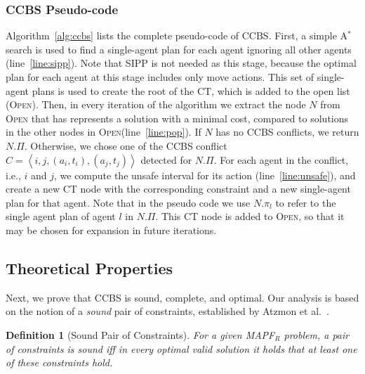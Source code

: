 \documentclass[review]{elsarticle}
\newtheorem{definition}{Definition}
\newcommand{\tuple}[1]{\ensuremath{\left \langle #1 \right \rangle }}
\newcommand\konstantin[1]{\nb{\textbf{Konstantin:}}{red}{#1}}
\newcommand\roni[1]{\nb{\textbf{Roni:}}{green}{#1}}
\newcommand\dor[1]{\nb{\textbf{Dor:}}{Fuchsia}{#1}}
\newcommand{\ccbs}{\ac{CCBS}\xspace}
\newcommand{\ct}{\ac{CT}\xspace}
\newcommand{\sipp}{\ac{SIPP}\xspace}
\newcommand{\astar}{A$^*$\xspace}
\newcommand{\mapfr}{\ac{MAPF}$_R$\xspace}
\newcommand{\OPEN}{\textsc{Open}\xspace}
\newcommand{\shortcite}{\cite}
\begin{document}
\subsubsection{\ccbs Pseudo-code}
Algorithm~\ref{alg:ccbs} lists the complete pseudo-code of \ccbs. First, a simple \astar search is used to find a single-agent plan for each agent ignoring all other agents (line~\ref{line:sipp}). Note that \sipp is not needed as this stage, because the optimal plan for each agent at this stage includes only move actions. %
This set of single-agent plans is used to create the root of the \ct, which is added to the open list (\OPEN). 
Then, in every iteration of the algorithm we extract the node $N$ from \OPEN that has represents a solution with a minimal cost, compared to solutions in the other nodes in \OPEN (line~\ref{line:pop}). 
If $N$ has no \ccbs conflicts, we return $N.\Pi$. 
Otherwise, we chose one of the \ccbs conflict $C=\tuple{i,j, (a_i,t_i), (a_j,t_j)}$ detected for $N.\Pi$. 
For each agent in the conflict, i.e., $i$ and $j$, we compute the unsafe interval for its action (line~\ref{line:unsafe}), and create a new \ct node with the corresponding constraint and a new single-agent plan for that agent. 
Note that in the pseudo code we use $N.\pi_l$ to refer to the single agent plan of agent $l$ in $N.\Pi$. This \ct node is added to \OPEN, so that it may be chosen for expansion in future iterations. 


\subsection{Theoretical Properties}



Next, we prove that \ccbs is sound, complete, and optimal. Our analysis is based on the notion of a \emph{sound} pair of constraints, established by Atzmon et al.~\shortcite{atzmon2018robust}. 

\begin{definition}[Sound Pair of Constraints]
For a given \mapfr problem, a pair of constraints is sound iff in every optimal valid solution it holds that at least one of these constraints hold. 
\label{def:sound}
\end{definition}
\end{document}
